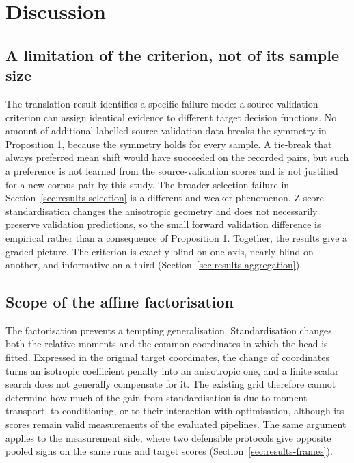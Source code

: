\section{Discussion}
\label{sec:discussion}

\subsection{A limitation of the criterion, not of its sample size}
\label{sec:discussion-selection}

The translation result identifies a specific failure mode: a source-validation
criterion can assign identical evidence to different target decision
functions. No amount of additional labelled source-validation data breaks the
symmetry in Proposition 1, because the symmetry holds for every sample. A
tie-break that always preferred mean shift would have succeeded on the recorded
pairs, but such a preference is not learned from the source-validation scores
and is not justified for a new corpus pair by this study. The broader selection
failure in Section~\ref{sec:results-selection} is a different and weaker
phenomenon. Z-score standardisation changes the anisotropic geometry and does
not necessarily preserve validation predictions, so the small forward
validation difference is empirical rather than a consequence of
Proposition 1. Together, the results give a graded picture. The criterion is
exactly blind on one axis, nearly blind on another, and informative on a third
(Section~\ref{sec:results-aggregation}).

\subsection{Scope of the affine factorisation}
\label{sec:discussion-practice}

The factorisation prevents a tempting generalisation. Standardisation changes
both the relative moments and the common coordinates in which the head is
fitted. Expressed in the original target coordinates, the change of
coordinates turns an isotropic coefficient penalty into an anisotropic one,
and a finite scalar search does not generally compensate for it. The existing
grid therefore cannot determine how much of the gain from standardisation is
due to moment transport, to conditioning, or to their interaction with
optimisation, although its scores remain valid measurements of the evaluated
pipelines. The same argument applies to the measurement side, where two
defensible protocols give opposite pooled signs on the same runs and target
scores (Section~\ref{sec:results-frames}).

